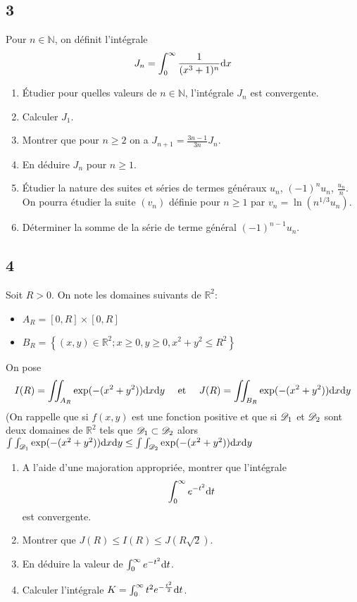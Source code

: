 \documentclass{article}[11pt]
\def \de {{\rm d}}
\begin{document}
\subsection*{3}
 Pour $n\in\mathbb{N}$, on définit l'intégrale 
 \[J_n=\int_0^\infty\frac{1}{(x^3+1)^n}\de x\]
 \begin{enumerate}
 \item Étudier pour quelles valeurs de $n\in\mathbb{N}$, l'intégrale $J_n$ est convergente.
 \item Calculer $J_1$.
 \item Montrer que pour $n\geq 2$ on a $J_{n+1}=\frac{3n-1}{3n}J_n$.
 \item En déduire $J_n$ pour $n\geq 1$.
 \item Étudier la nature des suites et séries de termes généraux $u_n$, $(-1)^nu_n$, $\frac{u_n}{n}$. On pourra étudier la suite $(v_n)$ définie pour $n\geq 1$ par $v_n=\ln(n^{1/3}u_n)$.
 \item Déterminer la somme de la série de terme général $(-1)^{n-1}u_n$.
 \end{enumerate}
 
 \subsection*{4}
 Soit $R>0$. On note les domaines suivants de $\mathbb{R}^2$:
 \begin{itemize}
 \item $A_R=[0,R]\times [0,R]$
 \item $B_R=\left\{(x,y)\in\mathbb{R}^2; x\geq 0,y\geq 0, x^2+y^2\leq R^2\right\}$
 \end{itemize}
 On pose 
 \[I(R)=\iint_{A_R}\exp(-(x^2+y^2))\de x\de y \quad \mbox{ et }\quad J(R)=\iint_{B_R}\exp(-(x^2+y^2))\de x\de y\]
  (On rappelle que si $f(x,y)$ est une fonction positive et que si ${\cal D}_1$ et ${\cal D}_2$ sont deux domaines de $\mathbb{R}^2$ tels que  ${\cal D}_1\subset {\cal D}_2$ alors $\int\int_{{\cal D}_1}\exp(-(x^2+y^2))\de x\de y\leq \int\int_{{\cal D}_2}\exp(-(x^2+y^2))\de x\de y$
 \begin{enumerate}
 \item A l'aide d'une majoration appropriée, montrer que l'intégrale 
 \[\int_0^\infty e^{-t^2}\de t\]
 est convergente.
 \item Montrer que $J(R)\leq I(R)\leq J(R\sqrt 2)$.
 \item En déduire la valeur de $\int_0^\infty e^{-t^2}\de t$.
 \item Calculer l'intégrale $K=\int_0^\infty t^2e^{-\frac{t^2}2}\de t$.
 \end{enumerate}
\end{document}
